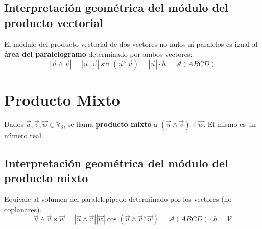 \documentclass[11pt,a4paper]{article}
\begin{document}
\subsection{Interpretaci\'on geom\'etrica del m\'odulo del producto vectorial}
\noindent El m\'odulo del producto vectorial de dos vectores no nulos ni paralelos es igual al \textbf{\'area del paralelogramo} determinado por ambos vectores:
$$|\overrightarrow{u}\wedge\overrightarrow{v}| = |\overrightarrow{u}||\overrightarrow{v}|\sin (\overrightarrow{u}\overset{\wedge}{,}\overrightarrow{v}) = |\overrightarrow{u}| \cdot h = \mathcal{A}(ABCD)$$

\section{Producto Mixto}
\noindent Dados $\overrightarrow{u}, \overrightarrow{v}, \overrightarrow{w} \in \mathbb{V}_3$, se llama \textbf{producto mixto} a $(\overrightarrow{u}\wedge\overrightarrow{v})\times\overrightarrow{w}$. El mismo es un n\'umero real.

\subsection{Interpretaci\'on geom\'etrica del m\'odulo del producto mixto}
\noindent Equivale al volumen del paralelep\'ipedo determinado por los vectores (no coplanares).
$$\overrightarrow{u}\wedge\overrightarrow{v}\times\overrightarrow{w} = |\overrightarrow{u}\wedge\overrightarrow{v}||\overrightarrow{w}|\cos(\overrightarrow{u}\wedge\overrightarrow{v}\overset{\wedge}{,}\overrightarrow{w}) = \mathcal{A}(ABCD)\cdot h = \mathcal{V}$$
\end{document}
